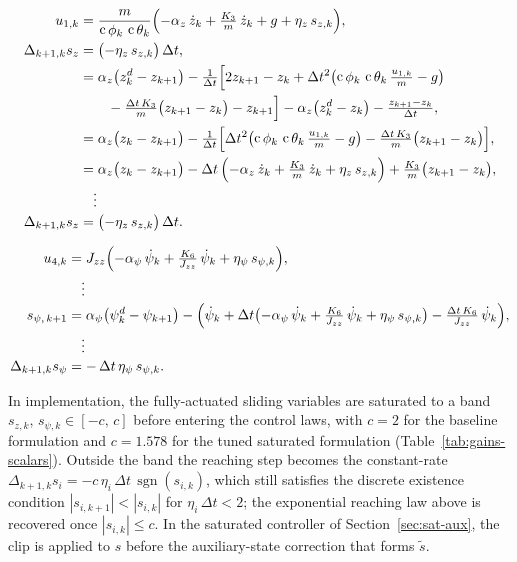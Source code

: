\documentclass[conf]{new-aiaa}
\DeclareMathOperator{\cs}{c}
\DeclareMathOperator{\sgn}{sgn}
\begin{document}
\begingroup
\small
\setlength{\jot}{0.5pt}
\begin{equation}
\label{eq:sz-wrap}
\begin{aligned}
u_{1,k}
&= \frac{m}{\cs\phi_k\,\cs\theta_k}\Bigl(-\alpha_z\,\dot z_k + \tfrac{K_3}{m}\,\dot z_k + g + \eta_z\, s_{z,k}\Bigr), \\
\Delta_{k+1,k} s_{z}
&= \bigl(-\eta_z\, s_{z,k}\bigr)\,\Delta t, \\
&= \alpha_z\bigl(z_k^{d} - z_{k+1}\bigr) - \tfrac{1}{\Delta t}\Bigl[2z_{k+1} - z_k + \Delta t^{2}\bigl(\cs\phi_k\,\cs\theta_k\,\tfrac{u_{1,k}}{m} - g\bigr) \\
&\qquad - \tfrac{\Delta t\,K_3}{m}\bigl(z_{k+1} - z_k\bigr) - z_{k+1}\Bigr] - \alpha_z\bigl(z_k^{d} - z_k\bigr) - \tfrac{z_{k+1} - z_k}{\Delta t}, \\
&= \alpha_z\bigl(z_k - z_{k+1}\bigr) - \tfrac{1}{\Delta t}\Bigl[\Delta t^{2}\bigl(\cs\phi_k\,\cs\theta_k\,\tfrac{u_{1,k}}{m} - g\bigr) - \tfrac{\Delta t\,K_3}{m}\bigl(z_{k+1} - z_k\bigr)\Bigr], \\
&= \alpha_z\bigl(z_k - z_{k+1}\bigr) - \Delta t\,\Bigl(-\alpha_z\,\dot z_k + \tfrac{K_3}{m}\,\dot z_k + \eta_z\, s_{z,k}\Bigr) + \tfrac{K_3}{m}\bigl(z_{k+1} - z_k\bigr), \\[-2pt]
&\quad \vdots \\[-2pt]
\Delta_{k+1,k} s_{z} &= \bigl(-\eta_z\, s_{z,k}\bigr)\,\Delta t.
\end{aligned}
\end{equation}
\endgroup

\begingroup
\small
\setlength{\jot}{0.5pt}
\begin{equation}
\label{eq:spsi-wrap-tighter}
\begin{aligned}
u_{4,k}
&= J_{zz}\Bigl(-\alpha_\psi\,\dot\psi_k + \tfrac{K_6}{J_{zz}}\,\dot\psi_k + \eta_\psi\, s_{\psi,k}\Bigr), \\[-2pt]
&\quad \vdots \\[-2pt]
s_{\psi,\,k+1}
&= \alpha_\psi\bigl(\psi_k^{d} - \psi_{k+1}\bigr) - \Bigl(\dot\psi_k + \Delta t\bigl(-\alpha_\psi\,\dot\psi_k + \tfrac{K_6}{J_{zz}}\,\dot\psi_k + \eta_\psi\, s_{\psi,k}\bigr) - \tfrac{\Delta t\,K_6}{J_{zz}}\,\dot\psi_k\Bigr), \\[-2pt]
&\quad \vdots \\[-2pt]
\Delta_{k+1,k}s_{\psi}
&= -\,\Delta t\, \eta_\psi\, s_{\psi,k}.
\end{aligned}
\end{equation}
\endgroup

In implementation, the fully-actuated sliding variables are saturated to a band $s_{z,k},\, s_{\psi,k} \in [-c,\, c]$ before entering the control laws, with $c = 2$ for the baseline formulation and $c = 1.578$ for the tuned saturated formulation (Table~\ref{tab:gains-scalars}). Outside the band the reaching step becomes the constant-rate $\Delta_{k+1,k} s_i = -c\,\eta_i\,\Delta t\,\sgn(s_{i,k})$, which still satisfies the discrete existence condition $|s_{i,k+1}| < |s_{i,k}|$ for $\eta_i\,\Delta t < 2$; the exponential reaching law above is recovered once $|s_{i,k}| \leq c$. In the saturated controller of Section~\ref{sec:sat-aux}, the clip is applied to $s$ before the auxiliary-state correction that forms $\tilde s$.
\end{document}
